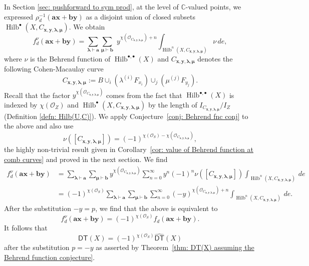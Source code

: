 \documentclass[12pt]{amsart}
\theoremstyle{definition}
\newcommand{\CC} {\mathbb{C}}          %
\renewcommand{\O}{\mathcal{O}}
\newcommand{\Hilb}{\operatorname{Hilb}}
\newcommand{\DT}{\mathsf{DT}}
\newcommand{\boldx}{\boldsymbol{x}}
\newcommand{\boldy}{\boldsymbol{y}}
\newcommand{\bolda}{\boldsymbol{a}}
\newcommand{\boldb}{\boldsymbol{b}}
\newcommand{\boldlambda}{\boldsymbol{\lambda }}
\newcommand{\boldmu}{\boldsymbol{\mu }}
\newcommand{\DThat}{\widehat{\DT}}
\begin{document}
In Section \ref{sec: pushforward to sym prod}, at the level of $\CC$-valued points, we expressed $\rho^{-1}_{d}(\bolda \boldx +\boldb \boldy )$ as a disjoint union of closed subsets $\Hilb^\bullet(X,C_{\boldx ,\boldy ,\boldlambda ,\boldmu})$. We obtain
\[
f_{d}^{\nu}(\bolda \boldx +\boldb \boldy ) = \sum_{\boldlambda \vdash
\bolda} \sum_{\boldmu \vdash \boldb} \,\, y^{\chi(\O_{C_{\boldx ,\boldy ,\boldlambda ,\boldmu}})+n}\int_{\Hilb^n(X,C_{\boldx ,\boldy ,\boldlambda ,\boldmu})} \nu \, de,
\]
where $\nu$ is the Behrend function of $\Hilb^{\bullet,\bullet}(X)$ and $C_{\boldx, \boldy, \boldlambda, \boldmu}$ denotes the following Cohen-Macaulay curve 
\[
C_{\boldx, \boldy, \boldlambda, \boldmu}:=B \cup_{i}\left(\lambda^{(i)}F_{x_{i}} \right) \cup_{j}\left(\mu^{(j)}F_{y_{j}} \right).
\]
Recall that the factor $y^{\chi(\O_{C_{\boldx ,\boldy ,\boldlambda ,\boldmu}})}$ comes from the fact that $\Hilb^{\bullet,\bullet}(X)$ is indexed by $\chi(\O_Z)$ and $\Hilb^\bullet(X,C_{\boldx ,\boldy ,\boldlambda ,\boldmu})$ by the length of $I_{C_{\boldx ,\boldy ,\boldlambda ,\boldmu}} / I_Z$ (Definition \ref{defn: Hilb(U,C)}). 
We apply Conjecture~\ref{conj: Behrend fnc conj} to the above and also
use 
\[
\nu ([C_{\boldx ,\boldy ,\boldlambda ,\boldmu}]) = (-1)^{\chi (\O_{S})-\chi (\O_{C_{\boldx ,\boldy ,\boldlambda ,\boldmu}})}, 
\]
the highly non-trivial result given in Corollary~\ref{cor: value of Behrend
function at comb curves} and proved in the next section. We find
\begin{align*}
f_{d}^{\nu}(\bolda \boldx +\boldb \boldy )& = \sum_{\boldlambda \vdash
\bolda} \sum_{\boldmu \vdash \boldb} y^{\chi
(\O_{C_{\boldx ,\boldy ,\boldlambda ,\boldmu}})}\sum_{n=0}^{\infty} y^{n}(-1)^{n}\nu ([C_{\boldx ,\boldy ,\boldlambda ,\boldmu}]) \int_{\Hilb^{n}(X,C_{\boldx ,\boldy ,\boldlambda ,\boldmu})}  \, de\\
&=(-1)^{\chi (\O_{S})} \sum_{\boldlambda \vdash \bolda} \sum_{\boldmu
\vdash \boldb} \sum_{n=0}^{\infty} (-y)^{\chi (\O_{C_{\boldx ,\boldy ,\boldlambda ,\boldmu}})+n}
\int_{\Hilb^{n}(X,C_{\boldx ,\boldy ,\boldlambda ,\boldmu})} \, de.
\end{align*}
After the substitution $-y=p$, we find that the above is equivalent to 
\[
f^{\nu}_{d}(\bolda \boldx +\boldb \boldy ) = (-1)^{\chi (\O_{S})}
f_{d}(\bolda \boldx +\boldb \boldy ).
\]
It follows that 
\[
\DT (X) = (-1)^{\chi (\O_{S})} \DThat (X)
\]
after the substitution $p=-y$ as asserted by Theorem~\ref{thm: DT(X)
assuming the Behrend function conjecture}.
\end{document}
